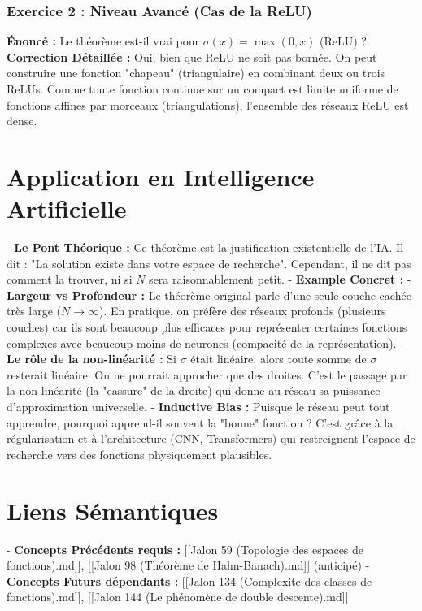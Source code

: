 \documentclass[11pt,a4paper]{article}
\begin{document}
\subsubsection{Exercice 2 : Niveau Avancé (Cas de la ReLU)}
\textbf{Énoncé :} Le théorème est-il vrai pour $\sigma(x) = \max(0, x)$ (ReLU) ?
\textbf{Correction Détaillée :}
Oui, bien que ReLU ne soit pas bornée. On peut construire une fonction "chapeau" (triangulaire) en combinant deux ou trois ReLUs. Comme toute fonction continue sur un compact est limite uniforme de fonctions affines par morceaux (triangulations), l'ensemble des réseaux ReLU est dense.

\section{Application en Intelligence Artificielle}

- \textbf{Le Pont Théorique :} Ce théorème est la justification existentielle de l'IA. Il dit : "La solution existe dans votre espace de recherche". Cependant, il ne dit pas comment la trouver, ni si $N$ sera raisonnablement petit.
- \textbf{Example Concret :}
    - \textbf{Largeur vs Profondeur :} Le théorème original parle d'une seule couche cachée très large ($N \to \infty$). En pratique, on préfère des réseaux profonds (plusieurs couches) car ils sont beaucoup plus efficaces pour représenter certaines fonctions complexes avec beaucoup moins de neurones (compacité de la représentation).
    - \textbf{Le rôle de la non-linéarité :} Si $\sigma$ était linéaire, alors toute somme de $\sigma$ resterait linéaire. On ne pourrait approcher que des droites. C'est le passage par la non-linéarité (la "cassure" de la droite) qui donne au réseau sa puissance d'approximation universelle.
    - \textbf{Inductive Bias :} Puisque le réseau peut tout apprendre, pourquoi apprend-il souvent la "bonne" fonction ? C'est grâce à la régularisation et à l'architecture (CNN, Transformers) qui restreignent l'espace de recherche vers des fonctions physiquement plausibles.

\section{Liens Sémantiques}

- \textbf{Concepts Précédents requis :} [[Jalon 59 (Topologie des espaces de fonctions).md]], [[Jalon 98 (Théorème de Hahn-Banach).md]] (anticipé)
- \textbf{Concepts Futurs dépendants :} [[Jalon 134 (Complexite des classes de fonctions).md]], [[Jalon 144 (Le phénomène de double descente).md]]
\end{document}
